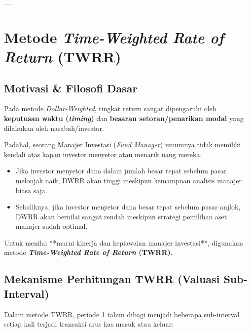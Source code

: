 \documentclass[11pt,a4paper]{article}
\begin{document}
---

\section{Metode \textit{Time-Weighted Rate of Return} (TWRR)}

\subsection{Motivasi \& Filosofi Dasar}
Pada metode \textit{Dollar-Weighted}, tingkat return sangat dipengaruhi oleh \textbf{keputusan waktu (\textit{timing})} dan \textbf{besaran setoran/penarikan modal} yang dilakukan oleh nasabah/investor. 

Padahal, seorang Manajer Investasi (\textit{Fund Manager}) umumnya tidak memiliki kendali atas kapan investor menyetor atau menarik uang mereka. 
\begin{itemize}[leftmargin=1.5em]
    \item Jika investor menyetor dana dalam jumlah besar tepat sebelum pasar melonjak naik, DWRR akan tinggi meskipun kemampuan analisis manajer biasa saja.
    \item Sebaliknya, jika investor menyetor dana besar tepat sebelum pasar anjlok, DWRR akan bernilai sangat rendah meskipun strategi pemilihan aset manajer sudah optimal.
\end{itemize}

Untuk menilai **murni kinerja dan kepiawaian manajer investasi**, digunakan metode \textbf{\textit{Time-Weighted Rate of Return} (TWRR)}.

\subsection{Mekanisme Perhitungan TWRR (Valuasi Sub-Interval)}

Dalam metode TWRR, periode 1 tahun dibagi menjadi beberapa sub-interval setiap kali terjadi transaksi arus kas masuk atau keluar:
\end{document}
